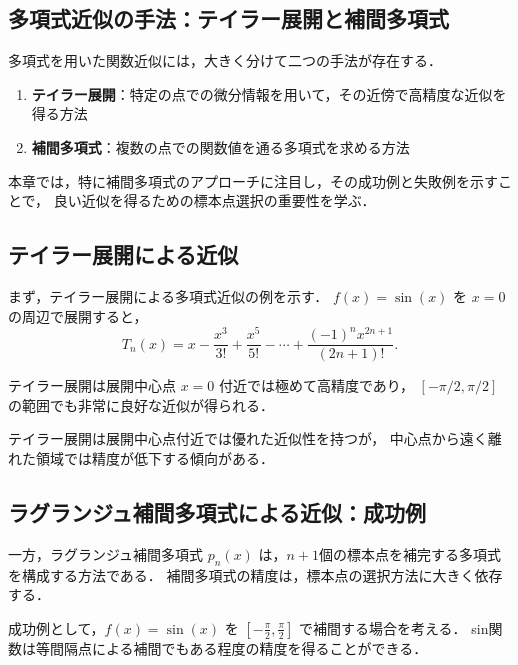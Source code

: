   \subsection{多項式近似の手法：テイラー展開と補間多項式}
    多項式を用いた関数近似には，大きく分けて二つの手法が存在する．
    \begin{enumerate}
      \item \textbf{テイラー展開}：特定の点での微分情報を用いて，その近傍で高精度な近似を得る方法
      \item \textbf{補間多項式}：複数の点での関数値を通る多項式を求める方法
    \end{enumerate}
    
    本章では，特に補間多項式のアプローチに注目し，その成功例と失敗例を示すことで，
    良い近似を得るための標本点選択の重要性を学ぶ．
\label{subsec:taylor_expansion}
  
  \subsection{テイラー展開による近似}
    まず，テイラー展開による多項式近似の例を示す．
    $f(x) = \sin(x)$ を $x = 0$ の周辺で展開すると，
    \[T_n(x) = x - \frac{x^3}{3!} + \frac{x^5}{5!} - \cdots + \frac{(-1)^n x^{2n+1}}{(2n+1)!} .\]
    
    テイラー展開は展開中心点 $x=0$ 付近では極めて高精度であり，
    $[-\pi/2, \pi/2]$ の範囲でも非常に良好な近似が得られる．
    
    \clearpage
    

    テイラー展開は展開中心点付近では優れた近似性を持つが，
    中心点から遠く離れた領域では精度が低下する傾向がある．
    

  \subsection{ラグランジュ補間多項式による近似：成功例}
    一方，ラグランジュ補間多項式 $p_n(x)$ は，$n+1$個の標本点を補完する多項式を構成する方法である．
    補間多項式の精度は，標本点の選択方法に大きく依存する．
    
    成功例として，$f(x) = \sin(x)$ を $[-\frac{\pi}{2}, \frac{\pi}{2}]$ で補間する場合を考える．
    sin関数は等間隔点による補間でもある程度の精度を得ることができる．
    
